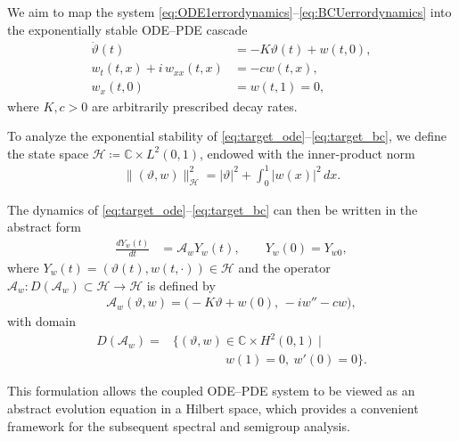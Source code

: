 \documentclass[letterpaper, 10 pt, conference]{ieeeconf}  %
\begin{document}
We aim to map the system \eqref{eq:ODE1errordynamics}--\eqref{eq:BCUerrordynamics} into the exponentially stable ODE--PDE cascade
\begin{align}
    \dot{\vartheta}(t) &= -K\vartheta(t) + w(t,0), \label{eq:target_ode}\\
    w_{t}(t,x) +i\,w_{xx}(t,x)&= - c w(t,x), \label{eq:target_pde}\\
    w_{x}(t,0) &= w(t,1) = 0, \label{eq:target_bc}
\end{align}
where $K, c > 0$ are arbitrarily prescribed decay rates.

To analyze the exponential stability of \eqref{eq:target_ode}--\eqref{eq:target_bc}, we define the state space $\mathcal{H} \coloneqq \mathbb{C}\times L^{2}(0,1)$, endowed with the inner-product norm
\begin{align}
    \|(\vartheta,w)\|^{2}_{\mathcal{H}} = |\vartheta|^{2} + \int_{0}^{1} |w(x)|^{2}\,dx. \label{eq:norm_schrodinger}  
\end{align}

The dynamics of \eqref{eq:target_ode}--\eqref{eq:target_bc} can then be written in the abstract form
\begin{align}
    \frac{d Y_{w}(t)}{dt} &= \mathcal{A}_{w} Y_{w}(t), 
    \qquad 
    Y_{w}(0) = Y_{w0},
    \label{eq:abstract_evolution}
\end{align}
where $Y_{w}(t) = (\vartheta(t), w(t,\cdot)) \in \mathcal{H}$ and the operator 
$\mathcal{A}_{w}\!: D(\mathcal{A}_{w}) \subset \mathcal{H} \to \mathcal{H}$ 
is defined by
\begin{align}
    \mathcal{A}_{w}(\vartheta,w) = \big(-K\vartheta + w(0),\, -i w'' - c w\big),
    \label{eq:operator_schrodinger}
\end{align}
with domain
\begin{align}
    D(\mathcal{A}_{w}) =& 
    \Big\{(\vartheta,w)\in \mathbb{C}\times H^{2}(0,1)\ \big|\nonumber \\
    &\qquad \qquad \ w(1)=0,\ w'(0)=0 \Big\}.
    \label{eq:domain_operator_schrodinger}
\end{align}

This formulation allows the coupled ODE--PDE system to be viewed as an abstract evolution equation in a Hilbert space, which provides a convenient framework for the subsequent spectral and semigroup analysis. 

\medskip
\end{document}
